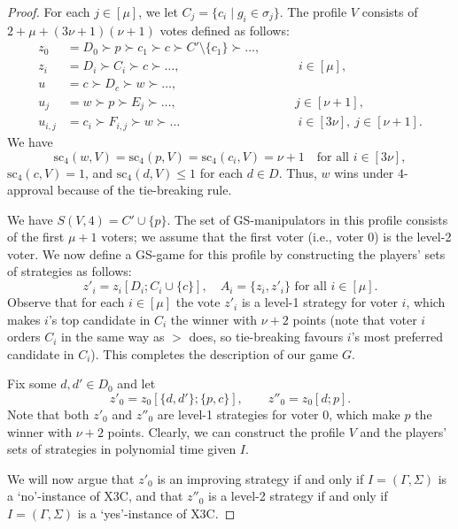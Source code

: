 \documentclass[11pt]{article}
\newcommand{\scr}{\mathrm{sc}}
\begin{document}
\begin{proof}
For each $j\in[\mu]$, we let $C_j=\{c_i\mid g_i\in \sigma_j\}$.
The profile $V$ consists of $2+\mu+(3\nu+1)(\nu+1)$ votes defined as follows:
\begin{align*}
z_0 &= D_0\succ p\succ c_1\succ c  \succ C'\setminus\{c_1\} \succ \dots, \\
 z_i &= D_i\succ C_i \succ c \succ \dots, \hspace{4cm} i\in [\mu], \\
  u &= c  \succ D_c \succ w \succ\dots,\\
 u_{j} &= w\succ p \succ E_j \succ \dots, \hspace{4cm} j\in [\nu+1],\\
 u_{i, j} &= c_i \succ F_{i,j} \succ w \succ \dots \hspace{4cm} i \in [3\nu],\ j\in [\nu+1].
 \end{align*}
We have 
$$
\scr_4(w, V)=\scr_4(p, V)=\scr_4(c_i, V)=\nu+1 \quad \text{for all $i\in [3\nu]$},
$$ 
$\scr_4(c, V)=1$, and $\scr_4(d, V)\le 1$ for each $d\in D$.
Thus, $w$ wins under $4$-approval because of the tie-breaking rule.

We have $S(V,4)=C'\cup\{p\}$. The set of GS-manipulators in this profile consists
of the first $\mu+1$ voters; we assume that the first voter (i.e., voter 0)
is the level-2 voter. 
We now define a GS-game for this profile by constructing the players' sets of strategies as follows:
\[
z'_i = z_i[D_i; C_i\cup\{c\}], \quad A_i = \{z_i, z'_i\} \text{ for all $i\in[\mu]$.}
\]
%
Observe that for each $i\in [\mu]$ the vote
$z'_i$ is a level-1 strategy for voter $i$, which makes $i$'s top candidate in $C_i$
the winner with $\nu+2$ points (note that voter $i$ orders $C_i$ in the same way as $>$ does, 
so tie-breaking favours $i$'s most preferred candidate in $C_i$).
This completes the description of our game $G$.

Fix some $d,d'\in D_0$ and let 
$$
z'_0 = z_0[\{d, d'\}; \{p, c\}], \qquad 
z''_0=z_0[d;p].
$$
Note that both $z'_0$ and $z''_0$ are level-1 strategies for voter $0$, 
which make $p$ the winner with $\nu+2$ points. 
Clearly, we can construct the profile $V$ and the players' sets of strategies 
in polynomial time given $I$.\par\smallskip

We will now argue that $z'_0$ is an improving strategy if and only if $I=(\Gamma, \Sigma)$ is a `no'-instance of {\sc X3C}, 
and that $z''_0$ is a level-2 strategy if and only if $I=(\Gamma, \Sigma)$ is a `yes'-instance of {\sc X3C}.


\end{proof}
\end{document}
